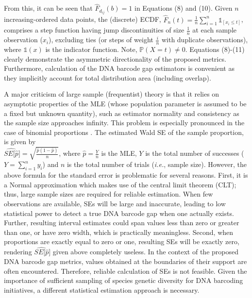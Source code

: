 \documentclass[12pt]{article}
\begin{document}
\noindent From this, it can be seen that $\hat{F}_{d_{ij}}(b) = 1$ in Equations (8) and (10). Given $n$ \\ increasing-ordered data points, the (discrete) ECDF, $\hat{F}_n(t) = \frac{1}{n}\sum_{i = 1}^n\mathds{1}_{[x_i \leq t]}$, comprises a step function having jump discontinuities of size $\frac{1}{n}$ at each sample observation ($x_i$), excluding ties (or steps of weight $\frac{i}{n}$ with duplicate observations), where $\mathds{1}(x)$ is the indicator function. Note, $\mathbb{P}(X = t) \neq 0$. Equations (8)-(11) clearly demonstrate the asymmetric directionality of the proposed metrics. Furthermore, calculation of the DNA barcode gap estimators is convenient as they implicitly account for total distribution area (including overlap).

A major criticism of large sample (frequentist) theory is that it relies on asymptotic properties of the MLE (whose population parameter is assumed to be a fixed but unknown quantity), such as estimator normality and consistency as the sample size approaches infinity. This problem is especially pronounced in the case of binomial proportions \citep{newcombe1998confidence}. The estimated Wald SE of the sample proportion, is given by \\ $\widehat{SE[\hat{p}}] = \sqrt{\frac{\hat{p}(1 - \hat{p})}{n}}$, where $\hat{p} = \frac{Y}{n}$ is the MLE, $Y$ is the total number of successes ($Y = \sum_{i=1}^n{y_i}$) and $n$ is the total number of trials (\textit{i.e.}, sample size). However, the above formula for the standard error is problematic for several reasons. First, it is a Normal approximation which makes use of the central limit theorem (CLT); thus, large sample sizes are required for reliable estimation. When few observations are available, SEs will be large and inaccurate, leading to low statistical power to detect a true DNA barcode gap when one actually exists. Further, resulting interval estimates could span values less than zero or greater than one, or have zero width, which is practically meaningless. Second, when proportions are exactly equal to zero or one, resulting SEs will be exactly zero, rendering $\widehat{SE[\hat{p}}]$ given above completely useless. In the context of the proposed DNA barcode gap metrics, values obtained at the boundaries of their support are often encountered. Therefore, reliable calculation of SEs is not feasible. Given the importance of sufficient sampling of species genetic diversity for DNA barcoding initiatives, a different statistical estimation approach is necessary. 
\end{document}
